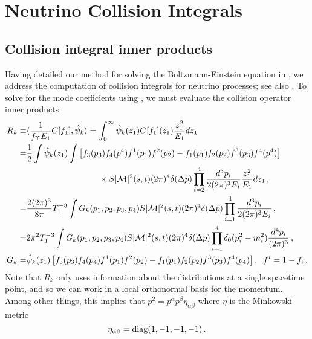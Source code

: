 \section{Neutrino Collision Integrals}\label{ch:coll:simp}
\subsection{Collision integral inner products}
Having detailed our method for solving the Boltzmann-Einstein equation in ,  we address the computation of collision integrals for neutrino processes; see also \cite{Birrell:2014uka}. To solve for the mode coefficients using , we must evaluate the collision operator inner products
\begin{align}\label{collision:integrals}
R_k\equiv&\langle\frac{1}{f_\Upsilon E_1}C[f_1],\hat\psi_k\rangle=\int_0^\infty \hat\psi_k(z_1)C[f_1](z_1) \frac{z_1^2}{E_1}dz_1\\
=&\frac{1}{2}\int \hat\psi_k(z_1)\int\left[f_3(p_3)f_4(p^4)f^1(p_1)f^2(p_2)-f_1(p_1)f_2(p_2)f^3(p_3)f^4(p^4)\right]\notag\\
&\hspace{30mm}\times S |\mathcal{M}|^2(s,t)(2\pi)^4\delta(\Delta p)\prod_{i=2}^4\frac{d^{3}p_i}{2(2\pi)^3E_i}\frac{z_1^2}{E_1}dz_1\,,\notag\\
=&\frac{2(2\pi)^3}{8\pi}T_1^{-3}\int G_k(p_1,p_2,p_3,p_4)S |\mathcal{M}|^2(s,t)(2\pi)^4\delta(\Delta p)\prod_{i=1}^4\frac{d^{3}p_i}{2(2\pi)^3E_i}\,,\notag\\
=&2\pi^2T_1^{-3}\int G_k(p_1,p_2,p_3,p_4)S |\mathcal{M}|^2(s,t)(2\pi)^4\delta(\Delta p)\prod_{i=1}^4 \delta_0(p_i^2-m_i^2)\frac{d^4p_i}{(2\pi)^3}\,,\notag\\
G_k=&\hat\psi_k(z_1)\left[f_3(p_3)f_4(p_4)f^1(p_1)f^2(p_2)-f_1(p_1)f_2(p_2)f^3(p_3)f^4(p_4)\right],\hspace{2mm} f^i=1- f_i\,.\notag
\end{align}
Note that $R_k$ only uses information about the distributions at a single spacetime point, and so we can work in a local orthonormal basis for the momentum.  Among other things, this implies that $p^2=p^\alpha p^\beta\eta_{\alpha\beta}$ where $\eta$ is the Minkowski metric
\begin{equation}
\eta_{\alpha\beta}=\mathrm{diag}(1,-1,-1,-1)\,.
\end{equation}

